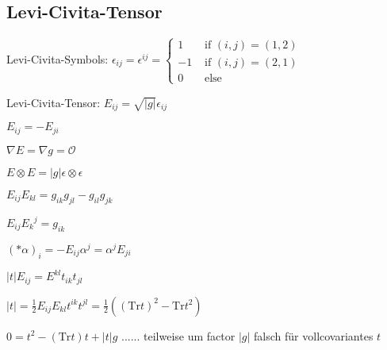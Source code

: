 \documentclass{scrartcl}
\newlength{\wlen}
\newcommand{\upperleft}[2]{\,\settowidth{\wlen}{$#2$}\hspace{-\wlen}\mbox{$\phantom{#2}$}^{#1}{#2}}
\newcommand{\lflat}[1]{\upperleft{\flat}{#1}}
\newcommand{\fstensor}[3]{{{#1}_{#2}}^{#3}}
\newcommand{\ffbasis}[2]{dx^{#1} \otimes dx^{#2}}
\begin{document}
    \subsection{Levi-Civita-Tensor}
      \begin{itemize}
        \item Levi-Civita-Symbols: 
             \( \epsilon_{ij} = \epsilon^{ij} =  
                  \begin{cases}
                    1 & \text{ if } (i,j)=(1,2) \\
                    -1 & \text{ if } (i,j)=(2,1) \\
                    0 & \text{ else}
                  \end{cases}\) 
        \item Levi-Civita-Tensor:
              \( E_{ij} = \sqrt{|g|}\epsilon_{ij} \)
        \item \( E_{ij} = -E_{ji} \)
        \item \( \nabla E = \nabla g = \mathcal{O} \)
        \item \( E\otimes E = |g| \epsilon \otimes \epsilon\)
        \item \( E_{ij}E_{kl} = g_{ik}g_{jl} - g_{il}g_{jk} \)
        \item \( E_{ij}\fstensor{E}{k}{j} = g_{ik} \)
        \item \( (*\alpha)_{i} = -E_{ij}\alpha^{j} = \alpha^{j}E_{ji}  \)
        {\color{red} 
        \item \( |t|E_{ij} = E^{kl}t_{ik}t_{jl} \)
        \item \( |t| = \frac{1}{2} E_{ij}E_{kl} t^{ik}t^{jl} = \frac{1}{2} \left( (\text{Tr}t)^{2} - \text{Tr}t^{2} \right) \)
        \item \( 0 = t^{2} - (\text{Tr}t)t + |t|g \) ...... teilweise um factor \( |g| \) falsch für
        vollcovariantes \( t \)}
      \end{itemize}

    
\end{document}

